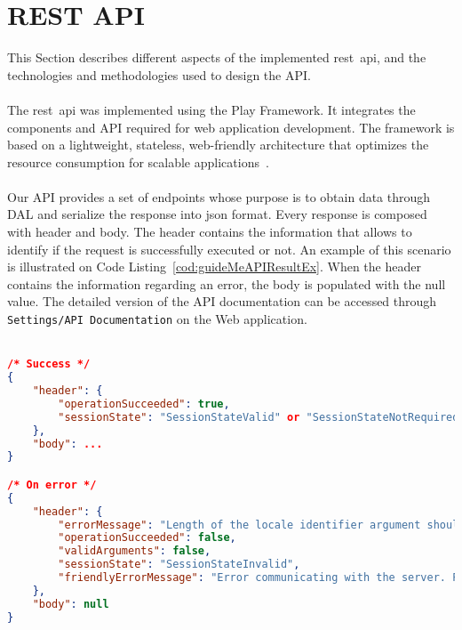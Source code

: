 \section{REST API}
\label{sec:RestAPIImplementation}
This Section describes different aspects of the implemented \gls{rest}~\gls{api}, and the technologies and methodologies used to design the API.\\
\\
The \gls{rest}~\gls{api} was implemented using the Play Framework. It integrates the components and API required for web application development. The framework is based on a lightweight, stateless, web-friendly architecture that optimizes the resource consumption for scalable applications~\cite{playPerformance}.\\
\\
Our API provides a set of endpoints whose purpose is to obtain data through DAL and serialize the response into \gls{json} format. Every response is composed with header and body. The header contains the information that allows to identify if the request is successfully executed or not. An example of this scenario is illustrated on Code Listing~\ref{cod:guideMeAPIResultEx}. When the header contains the information regarding an error, the body is populated with the null value. The detailed version of the API documentation can be accessed through \verb"Settings/API Documentation" on the Web application.\\
\\
\begin{lstlisting}[language=json,firstnumber=1,caption={Example of the success and error headers.},label={cod:guideMeAPIResultEx}]
/* Success */
{
    "header": {
        "operationSucceeded": true,
        "sessionState": "SessionStateValid" or "SessionStateNotRequired"
    },
    "body": ...
}

/* On error */
{
    "header": {
        "errorMessage": "Length of the locale identifier argument should be exactly 2",
        "operationSucceeded": false,
        "validArguments": false,
        "sessionState": "SessionStateInvalid",
        "friendlyErrorMessage": "Error communicating with the server. Please try again later."
    },
    "body": null
}
\end{lstlisting}
